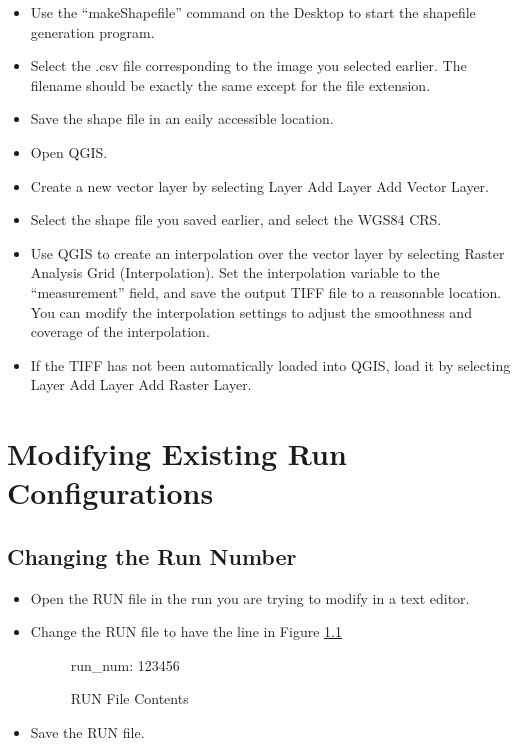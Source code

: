 \documentclass{report}
\begin{document}
\begin{itemize}
\begin{figure}[ht]
			\end{figure}
		\item Use the ``makeShapefile'' command on the Desktop to start the shapefile generation program.
		\item Select the .csv file corresponding to the image you selected earlier.  The filename should be exactly the same except for the file extension.
		\item Save the shape file in an eaily accessible location.
		\item Open QGIS.
		\item Create a new vector layer by selecting Layer \textrightarrow Add Layer \textrightarrow Add Vector Layer.
		\item Select the shape file you saved earlier, and select the WGS84 CRS.
		\item Use QGIS to create an interpolation over the vector layer by selecting Raster \textrightarrow Analysis \textrightarrow Grid (Interpolation).  Set the interpolation variable to the ``measurement'' field, and save the output TIFF file to a reasonable location.  You can modify the interpolation settings to adjust the smoothness and coverage of the interpolation.
		\item If the TIFF has not been automatically loaded into QGIS, load it by selecting Layer \textrightarrow Add Layer \textrightarrow Add Raster Layer.
	\end{itemize}
\chapter{Modifying Existing Run Configurations}
	\section{Changing the Run Number}
		\begin{itemize}
			\item Open the RUN file in the run you are trying to modify in a text editor.
			\item Change the RUN file to have the line in Figure \ref{lst:RUN_file}
				\begin{figure}[ht]
					\centering
					\caption{RUN File Contents}
					\label{lst:RUN_file}
					\begin{listing}{1}
run_num: 123456\end{listing}
				\end{figure}
			\item Save the RUN file.
		\end{itemize}
\end{document}
